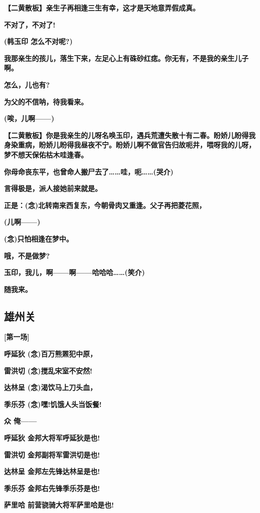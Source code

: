 \textbf{【二黄散板】亲生子再相逢三生有幸，这才是天地意弄假成真。}

\textbf{不对了，不对了!}

\textbf{(韩玉印 怎么不对呢?)}

\textbf{我那亲生的孩儿，落生下来，左足心上有硃砂红痣。你无有，不是我的亲生儿子啊。}

\textbf{怎么，儿也有?}

\textbf{为父的不信呐，待我看来。}

\textbf{(唉，儿啊------)}

\textbf{【二黄散板】你是我亲生的儿呀名唤玉印，遇兵荒遭失散十有二春。盼娇儿盼得我身染重病，盼娇儿盼得我昼夜不宁。盼娇儿啊不做官告归故呃井，喂呀我的儿呀，梦不想天保佑枯木哇逢春。}

\textbf{你母命丧东平，也曾命人搬尸去了\ldots{}\ldots{}哇，呃\ldots{}\ldots{}(哭介)}

\textbf{言得极是，派人接她前来就是。}

\textbf{正是：(念)北转南来西复东，今朝骨肉又重逢。父子再把菱花照，}

\textbf{(儿啊------)}

\textbf{(念)只怕相逢在梦中。}

\textbf{哦，不是做梦?}

\textbf{玉印，我儿，啊------啊------哈哈哈\ldots{}\ldots{}(笑介)}

\textbf{随我来。}

\newpage
\hypertarget{ux96c4ux5ddeux5173}{%
\subsection{雄州关}\label{ux96c4ux5ddeux5173}}

\textbf{{[}第一场{]}}

\textbf{呼延狄 (念)百万熊罴犯中原，}

\textbf{雷洪切 (念)搅乱宋室不安然!}

\textbf{达林呈 (念)渴饮马上刀头血，}

\textbf{季乐芬 (念)嘿!饥饿人头当饭餐!}

\textbf{众 俺------}

\textbf{呼延狄 金邦大将军呼延狄是也!}

\textbf{雷洪切 金邦副将军雷洪切是也!}

\textbf{达林呈 金邦左先锋达林呈是也!}

\textbf{季乐芬 金邦右先锋季乐芬是也!}

\textbf{萨里哈 前营骁骑大将军萨里哈是也!}

